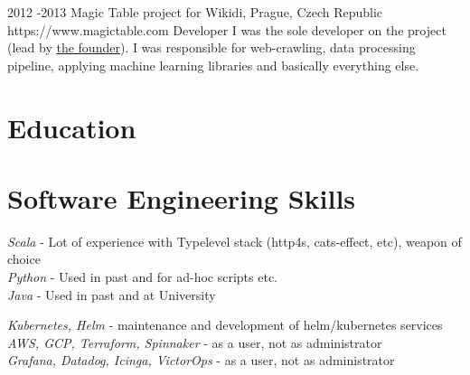 \documentclass[10pt]{article} %
\begin{document}

\job
{2012 -}{2013}
{Magic Table project for Wikidi, Prague, Czech Republic}
{https://www.magictable.com}
{Developer}
{I was the sole developer on the project (lead by \href{https://michal.illich.cz/}{the founder}). I was responsible for web-crawling, data processing pipeline, applying machine learning libraries and basically everything else. \\
}



\section{Education}



\section{Software Engineering Skills}

{
\textit{Scala} - Lot of experience with Typelevel stack (http4s, cats-effect, etc), weapon of choice\\
\textit{Python} - Used in past and for ad-hoc scripts etc.\\
\textit{Java} - Used in past and at University\\
}


{
\textit{Kubernetes, Helm} - maintenance and development of helm/kubernetes services\\
\textit{AWS, GCP, Terraform, Spinnaker} - as a user, not as administrator \\
\textit{Grafana, Datadog, Icinga, VictorOps} - as a user, not as administrator \\
}
\end{document}

